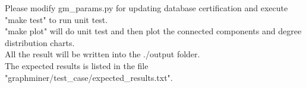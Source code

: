 Please modify gm\_params.py for updating database certification and execute "make test" to run unit test.
\\
"make plot" will do unit test and then plot the connected components and degree distribution charts.
\\
All the result will be written into the ./output folder.
\\
The expected results is listed in the file "graphminer/test\_case/expected\_results.txt".